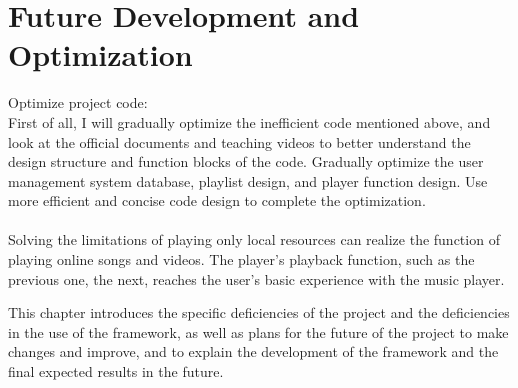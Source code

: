 \section{ Future Development and Optimization}
Optimize project code: \\
First of all, I will gradually optimize the inefficient code mentioned above, and look at the official documents and teaching videos to better understand the design structure and function blocks of the code. Gradually optimize the user management system database, playlist design, and player function design. Use more efficient and concise code design to complete the optimization. \\ \\ Solving the limitations of playing only local resources can realize the function of playing online songs and videos. The player's playback function, such as the previous one, the next, reaches the user's basic experience with the music player.  \\ 
\item This chapter introduces the specific deficiencies of the project and the deficiencies in the use of the framework, as well as plans for the future of the project to make changes and improve, and to explain the development of the framework and the final expected results in the future.
